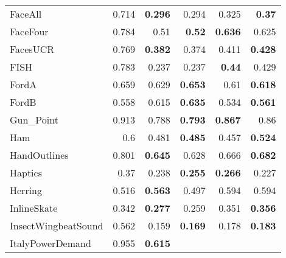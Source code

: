 \begin{longtable}[c]{|l||r||r|r||r|r|}
\rowcolor[rgb]{ .851,  .851,  .851} FaceAll &
0.714 &
\cellcolor[rgb]{ .973,  .796,  .678} \textbf{0.296} &
0.294 &
0.325 &
\cellcolor[rgb]{ .973,  .796,  .678} \textbf{0.37}
\\
FaceFour &
0.784 &
0.51 &
\cellcolor[rgb]{ .973,  .796,  .678} \textbf{0.52} &
\cellcolor[rgb]{ .973,  .796,  .678} \textbf{0.636} &
0.625
\\
\rowcolor[rgb]{ .851,  .851,  .851} FacesUCR &
0.769 &
\cellcolor[rgb]{ .973,  .796,  .678} \textbf{0.382} &
0.374 &
0.411 &
\cellcolor[rgb]{ .973,  .796,  .678} \textbf{0.428}
\\
FISH &
0.783 &
0.237 &
0.237 &
\cellcolor[rgb]{ .973,  .796,  .678} \textbf{0.44} &
0.429
\\
\rowcolor[rgb]{ .851,  .851,  .851} FordA &
0.659 &
0.629 &
\cellcolor[rgb]{ .973,  .796,  .678} \textbf{0.653} &
0.61 &
\cellcolor[rgb]{ .973,  .796,  .678} \textbf{0.618}
\\
FordB &
0.558 &
0.615 &
\cellcolor[rgb]{ .973,  .796,  .678} \textbf{0.635} &
0.534 &
\cellcolor[rgb]{ .973,  .796,  .678} \textbf{0.561}
\\
\rowcolor[rgb]{ .851,  .851,  .851} Gun\_Point &
0.913 &
0.788 &
\cellcolor[rgb]{ .973,  .796,  .678} \textbf{0.793} &
\cellcolor[rgb]{ .973,  .796,  .678} \textbf{0.867} &
0.86
\\
Ham &
0.6 &
0.481 &
\cellcolor[rgb]{ .973,  .796,  .678} \textbf{0.485} &
0.457 &
\cellcolor[rgb]{ .973,  .796,  .678} \textbf{0.524}
\\
\rowcolor[rgb]{ .851,  .851,  .851} HandOutlines &
0.801 &
\cellcolor[rgb]{ .973,  .796,  .678} \textbf{0.645} &
0.628 &
0.666 &
\cellcolor[rgb]{ .973,  .796,  .678} \textbf{0.682}
\\
Haptics &
0.37 &
0.238 &
\cellcolor[rgb]{ .973,  .796,  .678} \textbf{0.255} &
\cellcolor[rgb]{ .973,  .796,  .678} \textbf{0.266} &
0.227
\\
\rowcolor[rgb]{ .851,  .851,  .851} Herring &
0.516 &
\cellcolor[rgb]{ .973,  .796,  .678} \textbf{0.563} &
0.497 &
0.594 &
0.594
\\
InlineSkate &
0.342 &
\cellcolor[rgb]{ .973,  .796,  .678} \textbf{0.277} &
0.259 &
0.351 &
\cellcolor[rgb]{ .973,  .796,  .678} \textbf{0.356}
\\
\rowcolor[rgb]{ .851,  .851,  .851} InsectWingbeatSound &
0.562 &
0.159 &
\cellcolor[rgb]{ .973,  .796,  .678} \textbf{0.169} &
0.178 &
\cellcolor[rgb]{ .973,  .796,  .678} \textbf{0.183}
\\
ItalyPowerDemand &
0.955 &
\cellcolor[rgb]{ .973,  .796,  .678} \textbf{0.615} &

\end{longtable}
